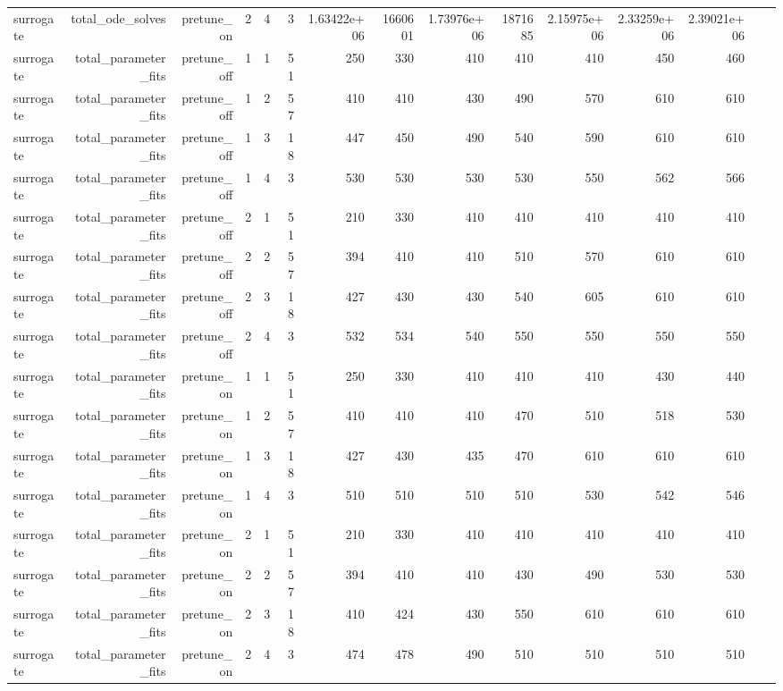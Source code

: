 \begin{table}[htbp]
\begin{tabular}{lrrrrrrrrrrrrrr}
surrogate & total\_ode\_solves & pretune\_on & 2 & 4 & 3 & 1.63422e+06 & 1660601 & 1.73976e+06 & 1871685 & 2.15975e+06 & 2.33259e+06 & 2.39021e+06 &  &  \\
surrogate & total\_parameter\_fits & pretune\_off & 1 & 1 & 51 & 250 & 330 & 410 & 410 & 410 & 450 & 460 &  &  \\
surrogate & total\_parameter\_fits & pretune\_off & 1 & 2 & 57 & 410 & 410 & 430 & 490 & 570 & 610 & 610 &  &  \\
surrogate & total\_parameter\_fits & pretune\_off & 1 & 3 & 18 & 447 & 450 & 490 & 540 & 590 & 610 & 610 &  &  \\
surrogate & total\_parameter\_fits & pretune\_off & 1 & 4 & 3 & 530 & 530 & 530 & 530 & 550 & 562 & 566 &  &  \\
surrogate & total\_parameter\_fits & pretune\_off & 2 & 1 & 51 & 210 & 330 & 410 & 410 & 410 & 410 & 410 &  &  \\
surrogate & total\_parameter\_fits & pretune\_off & 2 & 2 & 57 & 394 & 410 & 410 & 510 & 570 & 610 & 610 &  &  \\
surrogate & total\_parameter\_fits & pretune\_off & 2 & 3 & 18 & 427 & 430 & 430 & 540 & 605 & 610 & 610 &  &  \\
surrogate & total\_parameter\_fits & pretune\_off & 2 & 4 & 3 & 532 & 534 & 540 & 550 & 550 & 550 & 550 &  &  \\
surrogate & total\_parameter\_fits & pretune\_on & 1 & 1 & 51 & 250 & 330 & 410 & 410 & 410 & 430 & 440 &  &  \\
surrogate & total\_parameter\_fits & pretune\_on & 1 & 2 & 57 & 410 & 410 & 410 & 470 & 510 & 518 & 530 &  &  \\
surrogate & total\_parameter\_fits & pretune\_on & 1 & 3 & 18 & 427 & 430 & 435 & 470 & 610 & 610 & 610 &  &  \\
surrogate & total\_parameter\_fits & pretune\_on & 1 & 4 & 3 & 510 & 510 & 510 & 510 & 530 & 542 & 546 &  &  \\
surrogate & total\_parameter\_fits & pretune\_on & 2 & 1 & 51 & 210 & 330 & 410 & 410 & 410 & 410 & 410 &  &  \\
surrogate & total\_parameter\_fits & pretune\_on & 2 & 2 & 57 & 394 & 410 & 410 & 430 & 490 & 530 & 530 &  &  \\
surrogate & total\_parameter\_fits & pretune\_on & 2 & 3 & 18 & 410 & 424 & 430 & 550 & 610 & 610 & 610 &  &  \\
surrogate & total\_parameter\_fits & pretune\_on & 2 & 4 & 3 & 474 & 478 & 490 & 510 & 510 & 510 & 510 &  &  \\
\bottomrule
\end{tabular}
\end{table}
